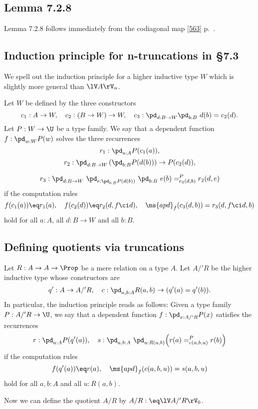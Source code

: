 \documentclass[12pt]{article}
\begin{document}

\subsection{Lemma 7.2.8}

Lemma 7.2.8 follows immediately from the codiagonal map \eqref{563} p.~\pageref{563}.


\subsection{Induction principle for n-truncations in \S7.3}

We spell out the induction principle for a higher inductive type $W$ which is slightly more general than $\lV A\rV_n$.

Let $W$ be defined by the three constructors 
$$
c_1:A\to W,\quad c_2:(B\to W)\to W,\quad c_3:\pd_{d:B\to W}\pd_{b:B}\ d(b)=c_2(d).
$$ 
Let $P:W\to\U$ be a type family. We say that a dependent function $f:\pd_{w:W}P(w)$ solves the three recurrences 
$$
r_1:\pd_{a:A}P(c_1(a)),
$$ 
$$
r_2:\pd_{d:B\to W}\left(\pd_{b:B}P(d(b))\right)\to P(c_2(d)),
$$

$$
r_3:\pd_{d:B\to W}\ \pd_{e:\pd_{b:B}P(d(b))}\ \pd_{b:B}\ e(b)=^P_{c_3(d,b)}r_2(d,e)
$$ 
if the computation rules
$$
f(c_1(a))\eq r_1(a),\quad f(c_2(d))\eq r_2(d,f\ci d),\quad\ms{apd}_f(c_3(d,b))=r_3(d,f\ci d,b)
$$ 
hold for all $a:A$, all $d:B\to W$ and all $b:B$. 


\subsection{Defining quotients via truncations}\label{qvt}

Let $R:A\to A\to\Prop$ be a mere relation on a type $A$. Let $A/'R$ be the higher inductive type whose constructors are 
$$
q':A\to A/'R,\quad c:\pd_{a,b:A}R(a,b)\to(q'(a)=q'(b)).
$$ 
In particular, the induction principle reads as follows: Given a type family $P:A/'R\to\U$, we say that a dependent function $f:\pd_{x:A/'R}P(x)$ satisfies the recurrences 
$$
r:\pd_{a:A}P(q'(a)),\quad s:\pd_{a,b:A}\ \pd_{u:R(a,b)}\Big(r(a)=^P_{c(a,b,u)}r(b)\Big)
$$ 
if the computation rules 
$$
f(q'(a))\eq r(a),\quad\ms{apd}_f(c(a,b,u))=s(a,b,u)
$$ 
hold for all $a,b:A$ and all $u:R(a,b)$. 

Now we can define the quotient $A/R$ by $A/R:\eq\lV A/'R\rV_0$. 

\end{document}

